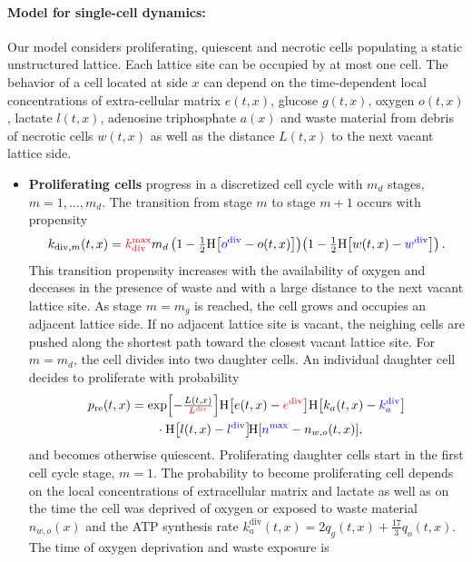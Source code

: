 \documentclass[10pt,letterpaper]{article}
\newcommand{\Heaviside}[1]{{\mathrm{H}\!\left[#1\right]}}
\newcommand{\sI}[1]{{\color{red}#1}}
\newcommand{\sII}[1]{{\color{blue}#1}}
\begin{document}
\paragraph{Model for single-cell dynamics:}
Our model considers proliferating, quiescent and necrotic cells populating a static unstructured lattice. Each lattice site can be occupied by at most one cell. The behavior of a cell located at side $x$ can depend on the time-dependent local concentrations of extra-cellular matrix $e(t,x)$, glucose $g(t,x)$, oxygen $o(t,x)$, lactate $l(t,x)$, adenosine triphosphate $a(x)$ and waste material from debris of necrotic cells $w(t,x)$ as well as the distance $L(t,x)$ to the next vacant lattice side. 
\begin{itemize}
%
\item \textbf{Proliferating cells} progress in a discretized cell cycle with $m_d$ stages, $m = 1,\ldots, m_d$. The transition from stage $m$ to stage $m+1$ occurs with propensity
\begin{equation*}
k_{\text{div},m}(t,x)  = \sI{k_{\text{div}}^{\max}} m_{d} \,  \!  \left(1 - \tfrac{1}{2} \Heaviside{\sII{o^{\text{div}}} - o(t,x)}\right) \! \left(1 - \tfrac{1}{2} \Heaviside{w(t,x)-\sII{w^{\text{div}}}}\right).
\end{equation*}
This transition propensity increases with the availability of oxygen and deceases in the presence of waste and with a large distance to the next vacant lattice site. As stage $m = m_g$ is reached, the cell grows and occupies an adjacent lattice side. If no adjacent lattice site is vacant, the neighing cells are pushed along the shortest path toward the closest vacant lattice site. For $m = m_{d}$, the cell divides into two daughter cells. An individual daughter cell decides to proliferate with probability
\begin{equation*}
\begin{aligned}
p_{\text{re}}(t,x) &= \exp\!\left[-\tfrac{L(t,x)}{\sI{L^{\text{div}}}}\right] \! \Heaviside{e(t,x)-\sI{e^{\text{div}}}} \Heaviside{k_a(t,x)-\sII{k_a^{\text{div}}}} \\
& \qquad \cdot \Heaviside{l(t,x)-\sII{l^{\text{div}}}} \! \Heaviside{\sII{n^{\max}} - n_{w,o}(t,x)},
\end{aligned}
\end{equation*}
and becomes otherwise quiescent. Proliferating daughter cells start in the first cell cycle stage, $m = 1$. The probability to become proliferating cell depends on the local concentrations of extracellular matrix and lactate as well as on the time the cell was deprived of oxygen or exposed to waste material $n_{w,o}(x)$ and the ATP synthesis rate $k_a^{\text{div}}(t,x) = 2 q_g(t,x) + \frac{17}{3} q_o(t,x)$. The time of oxygen deprivation and waste exposure is

\end{itemize}
\end{document}
